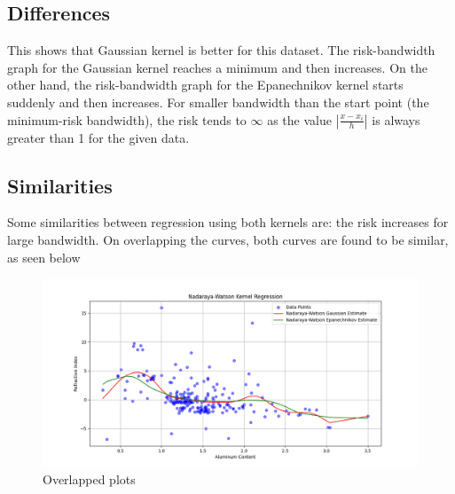 \subsection{Differences}
This shows that Gaussian kernel is better for this dataset. The risk-bandwidth graph for the Gaussian kernel reaches a minimum and then increases. On the other hand, the risk-bandwidth graph for the Epanechnikov kernel starts suddenly and then increases. For smaller bandwidth than the start point (the minimum-risk bandwidth), the risk tends to $\infty$ as the value $\left|\frac{x - x_i}{h}\right|$ is always greater than 1 for the given data.

\subsection{Similarities}
Some similarities between regression using both kernels are: the risk increases for large bandwidth. On overlapping the curves, both curves are found to be similar, as seen below
\begin{figure}[H]
    \centering
    \includegraphics[width=0.6\linewidth]{assets/images/overlapped_kernel_regression.png}
    \caption{Overlapped plots}
    \label{fig:4.3}
\end{figure}

